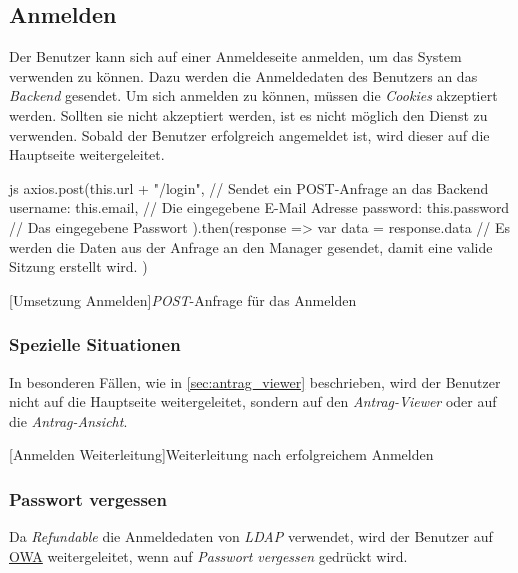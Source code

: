 \subsection{Anmelden}
Der Benutzer kann sich auf einer Anmeldeseite anmelden, um das System verwenden zu können. Dazu werden die Anmeldedaten des Benutzers an das \textit{Backend} gesendet. Um sich anmelden zu können, müssen die \textit{Cookies} akzeptiert werden. Sollten sie nicht akzeptiert werden, ist es nicht möglich den Dienst zu verwenden.
Sobald der Benutzer erfolgreich angemeldet ist, wird dieser auf die Hauptseite weitergeleitet.
\\
\begin{code}{js}
axios.post(this.url + "/login", {	// Sendet ein POST-Anfrage an das Backend
	username: this.email,	// Die eingegebene E-Mail Adresse
	password: this.password // Das eingegebene Passwort
}).then(response => {
	var data = response.data
	// Es werden die Daten aus der Anfrage an den Manager gesendet, damit eine valide Sitzung erstellt wird.
})
\end{code}
[Umsetzung Anmelden]{\textit{POST}-Anfrage für das Anmelden}~\\

\subsubsection{Spezielle Situationen}
In besonderen Fällen, wie in \autoref{sec:antrag_viewer} beschrieben, wird der Benutzer nicht auf die Hauptseite weitergeleitet, sondern auf den \textit{Antrag-Viewer} oder auf die \textit{Antrag-Ansicht}.
[Anmelden Weiterleitung]{Weiterleitung nach erfolgreichem Anmelden}~\\
\subsubsection{Passwort vergessen}
Da \textit{Refundable} die Anmeldedaten von \textit{LDAP} verwendet, wird der Benutzer auf \href{https://owa.tgm.ac.at}{OWA} weitergeleitet, wenn auf \textit{Passwort vergessen} gedrückt wird.
\newpage
